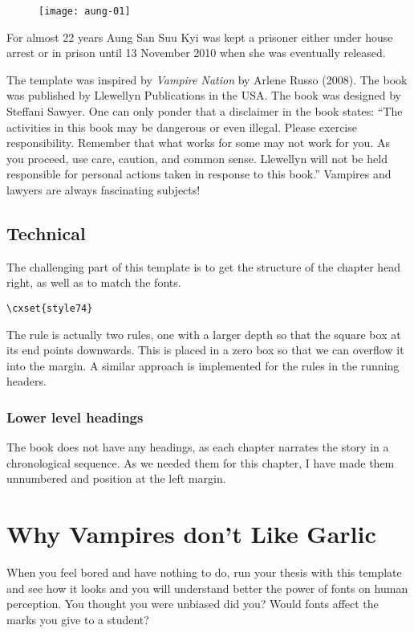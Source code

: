 \begin{figure}[ht]
\centering
\texttt{[image: aung-01]}
\end{figure}

For almost 22 years Aung San Suu Kyi was  kept a prisoner either under house arrest or in prison until 13 November 2010 when she was eventually released. 

The template was inspired by \emph{Vampire Nation} by Arlene Russo (2008). The book was published by Llewellyn Publications in the USA. The book was designed by Steffani Sawyer. One can only ponder that a disclaimer in the book states: “The activities in this book may be dangerous or even illegal. Please exercise responsibility. Remember that what works for some may not work for you. As you proceed, use care, caution, and common sense. Llewellyn will not be held responsible for personal actions taken in response to this book.”  Vampires and lawyers are always fascinating subjects!

\lorem\lorem\lorem

\section{Technical}

The challenging part of this template is to get the structure of the chapter head right, as well as to match the fonts.

\begin{verbatim}
\cxset{style74}
\end{verbatim}

The rule is actually two rules, one with a larger depth so that the square box at its end points downwards.
This is placed in a zero box so that we can overflow it into the margin. A similar approach is implemented for the rules in the running headers.

\subsection{Lower level headings}

The book does not have any headings, as each chapter narrates the story in a chronological sequence. As we needed them for this chapter, I have made them unnumbered and position at the left margin.


\chapter{Why Vampires don’t Like Garlic}

When you feel bored and have nothing to do, run your thesis with this template and see how it looks and you will understand better the power of fonts on human perception. You thought you were unbiased did you? Would fonts affect the marks you give to a student?

\makeatother
